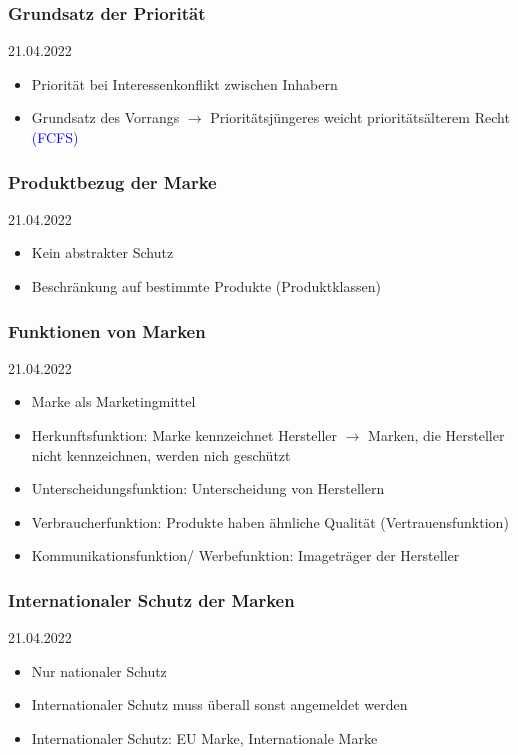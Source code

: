 \documentclass{report}
\begin{document}
\subsubsection{Grundsatz der Priorität}
21.04.2022
\begin{itemize}
	\item Priorität bei Interessenkonflikt zwischen Inhabern
	\item Grundsatz des Vorrangs $\rightarrow$ Prioritätsjüngeres weicht prioritätsälterem Recht \textcolor{blue}{(FCFS)}
\end{itemize}

\subsubsection{Produktbezug der Marke}
21.04.2022
\begin{itemize}
	\item Kein abstrakter Schutz
	\item Beschränkung auf bestimmte Produkte (Produktklassen)
\end{itemize}

\subsubsection{Funktionen von Marken}
21.04.2022
\begin{itemize}
	\item Marke als Marketingmittel
	\item Herkunftsfunktion: Marke kennzeichnet Hersteller
	\newline $\rightarrow$ Marken, die Hersteller nicht kennzeichnen, werden nich geschützt
	\item Unterscheidungsfunktion: Unterscheidung von Herstellern
	\item Verbraucherfunktion: Produkte haben ähnliche Qualität (Vertrauensfunktion)
	\item Kommunikationsfunktion/ Werbefunktion: Imageträger der Hersteller
\end{itemize}

\subsubsection{Internationaler Schutz der Marken}
21.04.2022
\begin{itemize}
	\item Nur nationaler Schutz
	\item Internationaler Schutz muss überall sonst angemeldet werden
	\item Internationaler Schutz: EU Marke, Internationale Marke
\end{itemize}
\end{document}
